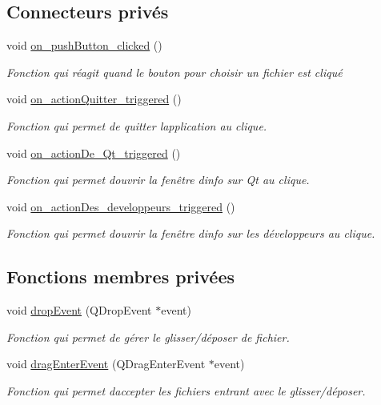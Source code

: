 \subsection*{Connecteurs privés}
\begin{DoxyCompactItemize}
\item 
void \hyperlink{classMainWindowLaunchDialog_a4464510ed5080984f0af0d3c0559f9eb}{on\+\_\+push\+Button\+\_\+clicked} ()
\begin{DoxyCompactList}\small\item\em Fonction qui réagit quand le bouton pour choisir un fichier est cliqué \end{DoxyCompactList}\item 
void \hyperlink{classMainWindowLaunchDialog_aad807a24560cbcb3d864a1c6b678537e}{on\+\_\+action\+Quitter\+\_\+triggered} ()
\begin{DoxyCompactList}\small\item\em Fonction qui permet de quitter l\textquotesingle{}application au clique. \end{DoxyCompactList}\item 
void \hyperlink{classMainWindowLaunchDialog_a91bfa59302a3591b7b3b11b03d6f9b0e}{on\+\_\+action\+De\+\_\+\+Qt\+\_\+triggered} ()
\begin{DoxyCompactList}\small\item\em Fonction qui permet d\textquotesingle{}ouvrir la fenêtre d\textquotesingle{}info sur Qt au clique. \end{DoxyCompactList}\item 
void \hyperlink{classMainWindowLaunchDialog_aaa766b56e4327b3bedf7f88c1b52cee7}{on\+\_\+action\+Des\+\_\+developpeurs\+\_\+triggered} ()
\begin{DoxyCompactList}\small\item\em Fonction qui permet d\textquotesingle{}ouvrir la fenêtre d\textquotesingle{}info sur les développeurs au clique. \end{DoxyCompactList}\end{DoxyCompactItemize}
\subsection*{Fonctions membres privées}
\begin{DoxyCompactItemize}
\item 
void \hyperlink{classMainWindowLaunchDialog_a6b292183d418fe79b79225d9a35bd3dd}{drop\+Event} (Q\+Drop\+Event $\ast$event)
\begin{DoxyCompactList}\small\item\em Fonction qui permet de gérer le glisser/déposer de fichier. \end{DoxyCompactList}\item 
void \hyperlink{classMainWindowLaunchDialog_aaf393173ffd6c63b2c4d5bdd48b8ddb4}{drag\+Enter\+Event} (Q\+Drag\+Enter\+Event $\ast$event)
\begin{DoxyCompactList}\small\item\em Fonction qui permet d\textquotesingle{}accepter les fichiers entrant avec le glisser/déposer. \end{DoxyCompactList}\end{DoxyCompactItemize}
